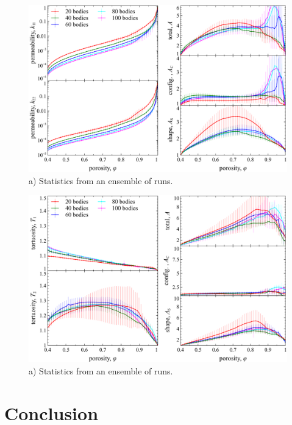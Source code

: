 \documentclass[3p]{elsarticle}
\begin{document}
\begin{figure}%
\centering
\includegraphics[width = 0.99 \textwidth]{./figs/fig5.pdf}
\caption{
a) Statistics from an ensemble of runs.
\label{fig5}
}
\end{figure}

\begin{figure}%
\centering
\includegraphics[width = 0.99 \textwidth]{./figs/fig6.pdf}
\caption{
a) Statistics from an ensemble of runs.
\label{fig6}
}
\end{figure}

\section{Conclusion}
\label{sec:conclusion}



\end{document}
